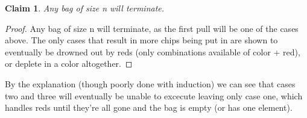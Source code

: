 \documentclass[11pt]{article}
\newtheorem{claim}[theorem]{Claim}
\begin{document}
	\begin{claim} 
		Any bag of size n will terminate.
	\end{claim}
	\begin{proof}
	 	Any bag of size n will terminate, as the first pull will be one of the cases above. The only cases that result in more chips being put in are shown to eventually be drowned out by reds (only combinations available of color + red), or deplete in a color altogether. 
	\end{proof}


By the explanation (though poorly done with induction) we can see that cases two and three will eventually be unable to excecute leaving only case one, which handles reds until they're all gone and the bag is empty (or has one element).
	\newpage
	
	
\end{document}

